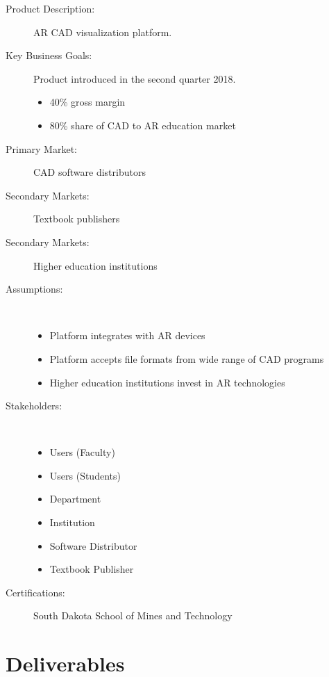 \begin{description}
	\item [Product Description:] AR CAD visualization platform.
	
	\item [Key Business Goals:] Product introduced in the second quarter 2018.
	\begin{itemize}
		\item 40\% gross margin
		\item 80\% share of CAD to AR education market
	\end{itemize}
	
	\item [Primary Market:] CAD software distributors
	\item [Secondary Markets:] Textbook publishers
	\item [Secondary Markets:] Higher education institutions
	
	\item [Assumptions:]  ~~ \\
	\begin{itemize}
		\item Platform integrates with AR devices 
		\item Platform accepts file formats from wide range of CAD programs
		\item Higher education institutions invest in AR technologies
	\end{itemize}
	
	\item [Stakeholders:]  ~~ \\
	\begin{itemize}
		\item Users (Faculty)
		\item Users (Students)
		\item Department
		\item Institution
		\item Software Distributor
		\item Textbook Publisher
	\end{itemize}
	
	\item [Certifications:] South Dakota School of Mines and Technology
\end{description}

\section{Deliverables}

 

